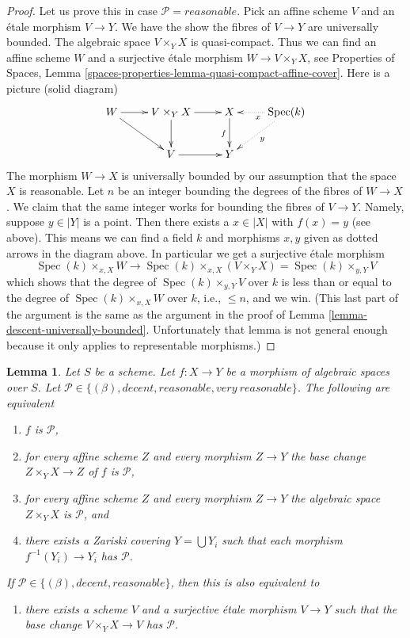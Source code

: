 \documentclass{stacks-project}
\theoremstyle{plain}
\newtheorem{lemma}[subsection]{Lemma}
\theoremstyle{definition}
\theoremstyle{remark}
\numberwithin{equation}{subsection}
\def\Spec{\mathop{\mathrm{Spec}}}
\begin{document}
\begin{proof}
\medskip\noindent
Let us prove this in case $\mathcal{P} = reasonable$.
Pick an affine scheme $V$ and an \'etale morphism $V \to Y$.
We have the show the fibres of $V \to Y$ are universally bounded.
The algebraic space $V \times_Y X$ is quasi-compact.
Thus we can find an affine scheme $W$ and a surjective \'etale morphism
$W \to V \times_Y X$, see
Properties of Spaces,
Lemma \ref{spaces-properties-lemma-quasi-compact-affine-cover}.
Here is a picture (solid diagram)
$$
\xymatrix{
W \ar[r]  \ar[rd] &
V \times_Y X \ar[r] \ar[d] &
X \ar[d]_f & \Spec(k) \ar@{..>}[l]^x \ar@{..>}[ld]^y \\
 & V \ar[r] & Y
}
$$
The morphism $W \to X$ is universally bounded by our assumption that
the space $X$ is reasonable. Let $n$ be an integer bounding
the degrees of the fibres of $W \to X$. We claim that the same integer
works for bounding the fibres of $V \to Y$. Namely, suppose $y \in |Y|$
is a point. Then there exists a $x \in |X|$ with $f(x) = y$ (see above).
This means we can find a field $k$ and morphisms $x, y$ given as dotted
arrows in the diagram above. In particular we get a surjective \'etale
morphism
$$
\Spec(k) \times_{x, X} W
\to
\Spec(k) \times_{x, X} (V \times_Y X) = \Spec(k) \times_{y, Y} V
$$
which shows that the degree of $\Spec(k) \times_{y, Y} V$ over $k$
is less than or equal to the degree of $\Spec(k) \times_{x, X} W$
over $k$, i.e., $\leq n$, and we win. (This last part of the argument
is the same as the argument in the proof of
Lemma \ref{lemma-descent-universally-bounded}.
Unfortunately that lemma is not general enough because it only applies
to representable morphisms.)
\end{proof}

\begin{lemma}
\label{lemma-relative-conditions-local}
Let $S$ be a scheme.
Let $f : X \to Y$ be a morphism of algebraic spaces over $S$.
Let $\mathcal{P} \in \{(\beta), decent, reasonable, very\ reasonable\}$.
The following are equivalent
\begin{enumerate}
\item $f$ is $\mathcal{P}$,
\item for every affine scheme $Z$ and every morphism $Z \to Y$ the
base change $Z \times_Y X \to Z$ of $f$ is $\mathcal{P}$,
\item for every affine scheme $Z$ and every morphism $Z \to Y$ the
algebraic space $Z \times_Y X$ is $\mathcal{P}$, and
\item there exists a Zariski covering $Y = \bigcup Y_i$ such
that each morphism $f^{-1}(Y_i) \to Y_i$ has $\mathcal{P}$.
\end{enumerate}
If $\mathcal{P} \in \{(\beta), decent, reasonable\}$, then this is also
equivalent to
\begin{enumerate}
\item[(5)] there exists a scheme $V$ and a surjective \'etale morphism
$V \to Y$ such that the base change $V \times_Y X \to V$ has
$\mathcal{P}$.
\end{enumerate}
\end{lemma}
\end{document}
